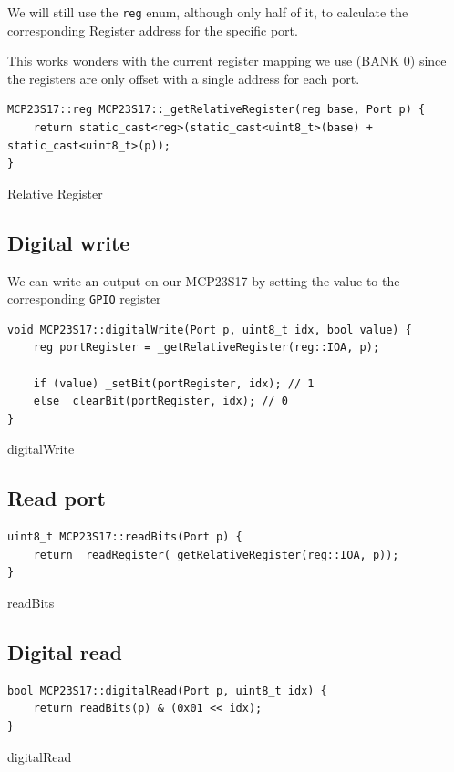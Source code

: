 \documentclass{article}
\begin{document}
We will still use the \verb|reg| enum, although only half of it, to calculate the corresponding Register address for the specific port.

This works wonders with the current register mapping we use (BANK 0) since the registers are only offset with a single address for each port.

\begin{listing}[H]
\begin{verbatim}
MCP23S17::reg MCP23S17::_getRelativeRegister(reg base, Port p) {
    return static_cast<reg>(static_cast<uint8_t>(base) + static_cast<uint8_t>(p));
}
\end{verbatim}
\caption{Relative Register}
\end{listing}

\subsection{Digital write}

We can write an output on our MCP23S17 by setting the value to the corresponding \verb|GPIO| register

\begin{listing}[H]
\begin{verbatim}
void MCP23S17::digitalWrite(Port p, uint8_t idx, bool value) {
    reg portRegister = _getRelativeRegister(reg::IOA, p);

    if (value) _setBit(portRegister, idx); // 1
    else _clearBit(portRegister, idx); // 0
}
\end{verbatim}
\caption{digitalWrite}
\end{listing}

\subsection{Read port}

\begin{listing}[H]
\begin{verbatim}
uint8_t MCP23S17::readBits(Port p) {
    return _readRegister(_getRelativeRegister(reg::IOA, p));
}
\end{verbatim}
\caption{readBits}
\end{listing}

\subsection{Digital read}

\begin{listing}[H]
\begin{verbatim}
bool MCP23S17::digitalRead(Port p, uint8_t idx) {
    return readBits(p) & (0x01 << idx);
}
\end{verbatim}
\caption{digitalRead}
\end{listing}
\end{document}
